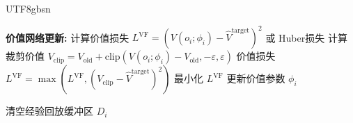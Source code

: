 \documentclass{article}
\begin{document}
\begin{CJK}{UTF8}{gbsn}
\begin{algorithm}
\begin{algorithmic}[1]
                    \State \textbf{价值网络更新:}
                    \State 计算价值损失 $L^{\text{VF}} = (V(o_i;\phi_i) - \hat{V}^{\text{target}})^2$ 或 Huber损失
                        \State 计算裁剪价值 $V_{\text{clip}} = V_{\text{old}} + \text{clip}(V(o_i;\phi_i) - V_{\text{old}}, -\varepsilon, \varepsilon)$
                        \State 价值损失 $L^{\text{VF}} = \max(L^{\text{VF}}, (V_{\text{clip}} - \hat{V}^{\text{target}})^2)$
                    \EndIf
                    \State 最小化 $L^{\text{VF}}$ 更新价值参数 $\phi_i$
                \EndFor
            \EndFor
            
            \State 清空经验回放缓冲区 $D_i$
        \EndFor
    \EndIf
\EndFor
\end{algorithmic}
\end{algorithm}

\end{CJK}
\end{document}
